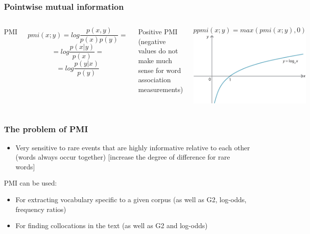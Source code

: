 \documentclass[svgnames]{beamer}
\begin{document}
\begin{frame}
  \frametitle{Pointwise mutual information}
  \begin{columns}
    PMI

  $$
  pmi(x;y) = log \frac{p(x,y)}{p(x)p(y)} =
  $$
  $$
  = log \frac{p(x|y)}{p(x)} =
  $$
  $$
  = log \frac{p(y|x)}{p(y)}
  $$

  Positive PMI (negative values do not make much sense for word association measurements)

    $$
    ppmi(x;y) = max(pmi(x;y),0)
    $$
  \includegraphics[width=\textwidth]{log}
  \end{columns}
\end{frame}

\begin{frame}
  \frametitle{The problem of PMI}
  \begin{itemize}
  \item Very sensitive to rare events that are highly informative relative to each other (words always occur together)
    [increase the degree of difference for rare words]
  \end{itemize}
\end{frame}

\begin{frame}
  PMI can be used:
  \begin{itemize}
    \item For extracting vocabulary specific to a given corpus (as well as G2, log-odds, frequency ratios)
    \item For finding collocations in the text (as well as G2 and log-odds)
  \end{itemize}
\end{frame}
\end{document}
